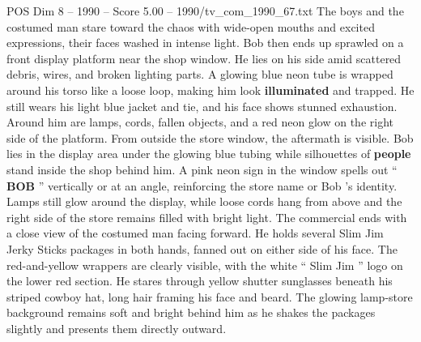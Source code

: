 \begin{textsample}{POS Dim 8 – 1990 – Score 5.00 – 1990/tv\_com\_1990\_67.txt}
The boys and the costumed man stare toward the chaos with wide-open mouths and excited expressions, their faces washed in intense light.
Bob then ends up sprawled on a front display platform near the shop window.
He lies on his side amid scattered debris, wires, and broken lighting parts.
A glowing blue neon tube is wrapped around his torso like a loose loop, making him look \textbf{illuminated} and trapped.
He still wears his light blue jacket and tie, and his face shows stunned exhaustion.
Around him are lamps, cords, fallen objects, and a red neon glow on the right side of the platform.
From outside the store window, the aftermath is visible.
Bob lies in the display area under the glowing blue tubing while silhouettes of \textbf{people} stand inside the shop behind him.
A pink neon sign in the window spells out “ \textbf{BOB} ” vertically or at an angle, reinforcing the store name or Bob ’s identity.
Lamps still glow around the display, while loose cords hang from above and the right side of the store remains filled with bright light.
The commercial ends with a close view of the costumed man facing forward.
He holds several Slim Jim Jerky Sticks packages in both hands, fanned out on either side of his face.
The red-and-yellow wrappers are clearly visible, with the white “ Slim Jim ” logo on the lower red section.
He stares through yellow shutter sunglasses beneath his striped cowboy hat, long hair framing his face and beard.
The glowing lamp-store background remains soft and bright behind him as he shakes the packages slightly and presents them directly outward.

\end{textsample}
